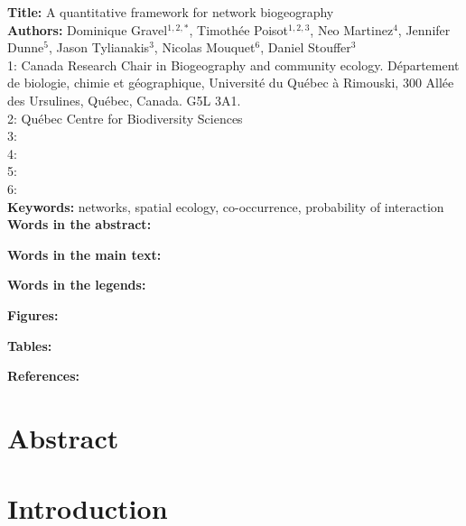 \documentclass[12pt]{article}
\begin{document}
\linenumbers 
\modulolinenumbers[1]

\textbf{Title:} A quantitative framework for network biogeography\\

\textbf{Authors:} Dominique Gravel$^{1,2,*}$, Timoth\'ee Poisot$^{1,2,3}$, Neo
Martinez$^{4}$, Jennifer Dunne$^{5}$, Jason Tylianakis$^{3}$, Nicolas
Mouquet$^{6}$, Daniel Stouffer$^{3}$ \\

1: Canada Research Chair in Biogeography and community ecology. D\'epartement de
biologie, chimie et g\'eographique, Universit\'e du Qu\'ebec \`a Rimouski, 300
All\'ee des Ursulines, Qu\'ebec, Canada. G5L 3A1.\\

2: Qu\'ebec Centre for Biodiversity Sciences\\

3: \\

4: \\

5: \\

6:\\

\textbf{Keywords:} networks, spatial ecology, co-occurrence, probability of interaction\\

\textbf{Words in the abstract:}  

\textbf{Words in the main text:}  

\textbf{Words in the legends:}   

\textbf{Figures:} 

\textbf{Tables:}         

\textbf{References:} 

\newpage
\doublespacing

\section*{Abstract} 

\newpage
\section*{Introduction}
\end{document}
